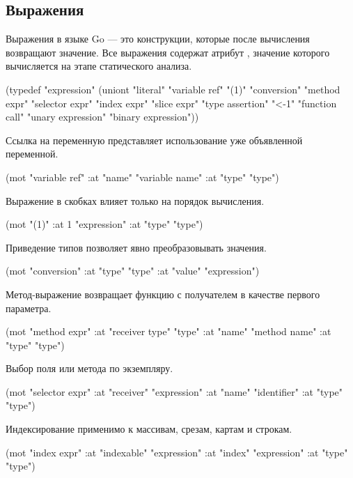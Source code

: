 \documentclass[12pt,twoside,russian]{article}
\newcommand{\textABMLString}[1]{{\color{abmlString}#1}}
\newcommand{\ABMLString}[1]{\abmlinline{\textABMLString{#1}}}
\begin{document}
\subsection{Выражения}
Выражения в языке Go — это конструкции, которые после вычисления возвращают значение. Все выражения содержат атрибут \ABMLString{type}, значение которого вычисляется на этапе статического анализа.

\begin{ABMLCode}
(typedef "expression" 
    (uniont "literal" "variable ref" "(1)" 
		"conversion" "method expr" "selector expr" "index expr" 
		"slice expr" "type assertion" "<-1" "function call" 
		"unary expression" "binary expression"))
\end{ABMLCode}

Ссылка на переменную представляет использование уже объявленной переменной.

\begin{ABMLCode}
(mot "variable ref" :at "name" "variable name" :at "type" "type")
\end{ABMLCode}

Выражение в скобках влияет только на порядок вычисления.

\begin{ABMLCode}
(mot "(1)" :at 1 "expression" :at "type" "type")
\end{ABMLCode}

Приведение типов позволяет явно преобразовывать значения.

\begin{ABMLCode}
(mot "conversion" :at "type" "type" :at "value" "expression")
\end{ABMLCode}

Метод-выражение возвращает функцию с получателем в качестве первого параметра.

\begin{ABMLCode}
(mot "method expr" :at "receiver type" "type"
		   :at "name" "method name"
                   :at "type" "type")
\end{ABMLCode}

Выбор поля или метода по экземпляру.

\begin{ABMLCode}
(mot "selector expr" :at "receiver" "expression"
		     :at "name" "identifier" 
                     :at "type" "type")
\end{ABMLCode}

Индексирование применимо к массивам, срезам, картам и строкам.

\begin{ABMLCode}
(mot "index expr" :at "indexable" "expression"
		  :at "index" "expression" 
                  :at "type" "type")
\end{ABMLCode}
\end{document}
